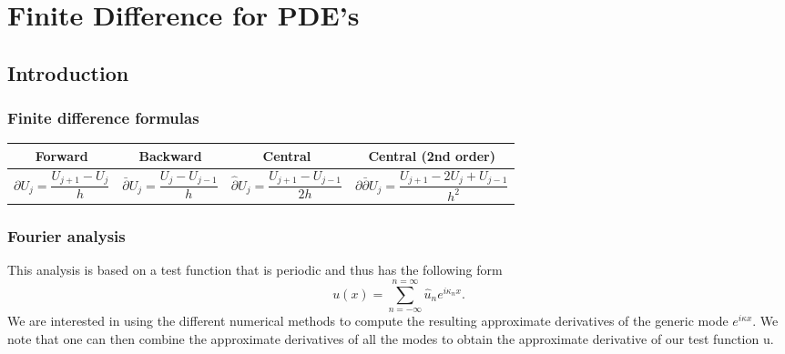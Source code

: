 \documentclass[oneside,a4paper,11pt]{report}
\begin{document}
\part{Finite Difference for PDE's}

\chapter{Introduction}
\section{Finite difference formulas}
\begin{center}
\begin{tabular}{|c|c|c|c|}
\hline
Forward & Backward & Central & Central (2nd order)\\
\hline
\parbox{3cm}{\[\partial U_j = \frac{U_{j+1} - U_{j}}{h}\]} &
\parbox{3cm}{\[\bar{\partial} U_j = \frac{U_{j} - U_{j-1}}{h}\]} & 
\parbox{4cm}{\[\hat{\partial} U_j = \frac{U_{j+1} - U_{j-1}}{2h}\]} &
\parbox{5cm}{\[\partial \bar{\partial} U_j = \frac{U_{j+1} - 2U_j + U_{j-1}}{h^2}\]}\\
\hline
\end{tabular}
\end{center}

\section{Fourier analysis}
This analysis is based on a test function that is periodic and thus has the following form
\begin{equation}
    u(x) = \sum_{n = -\infty}^{n=\infty} \hat{u}_n e^{i \kappa_n x}.
\end{equation}
We are interested in using the different numerical methods to compute the resulting approximate derivatives of the generic mode $e^{i \kappa x}$. We note that one can then combine the approximate derivatives of all the modes to obtain the approximate derivative of our test function u.
\end{document}
